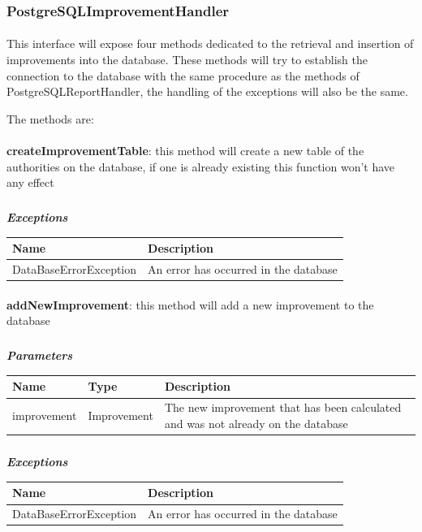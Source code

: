 				\subsubsection{PostgreSQLImprovementHandler}
					\paragraph{}
						This interface will expose four methods dedicated to the retrieval and insertion of improvements into the database. These methods will try to establish the connection to the database with the same procedure as the methods of PostgreSQLReportHandler, the handling of the exceptions will also be the same.
						
						The methods are:
							\paragraph{}
							\textbf{createImprovementTable}: this method will create a new table of the authorities on the database, if one is already existing this function won't have any effect
							\subparagraph{}
								\textit{\textbf{Exceptions}}
									\begin{table}[!h]
									\begin{tabular}{L{0.3\textwidth}L{0.3\textwidth}}
										\toprule
										Name & Description \\
										\midrule
								  		DataBaseErrorException & An error has occurred in the database \\ 
								 		\bottomrule
									\end{tabular}
								\end{table}
								
					\paragraph{}
							\textbf{addNewImprovement}: this method will add a new improvement to the database
							\subparagraph{}
							\textit{\textbf{Parameters}}
								\begin{table}[!h]
									\begin{tabular}{L{0.2\textwidth}L{0.2\textwidth}L{0.2\textwidth}}
										\toprule
										Name & Type & Description \\
										\midrule
								  		improvement & Improvement & The new improvement that has been calculated and was not already on the database \\
								 		\bottomrule
									\end{tabular}
								\end{table}
							\subparagraph{}
								\textit{\textbf{Exceptions}}
									\begin{table}[!h]
									\begin{tabular}{L{0.3\textwidth}L{0.3\textwidth}}
										\toprule
										Name & Description \\
										\midrule
								  		DataBaseErrorException & An error has occurred in the database \\ 
								 		\bottomrule
									\end{tabular}
								\end{table}
								
